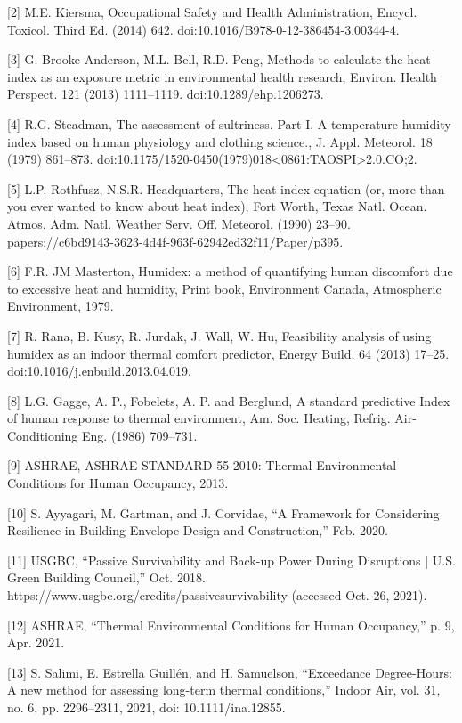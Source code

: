 {[}2{]} M.E. Kiersma, Occupational Safety and Health Administration, Encycl.
Toxicol. Third Ed. (2014) 642. doi:10.1016/B978-0-12-386454-3.00344-4.

{[}3{]} G. Brooke Anderson, M.L. Bell, R.D. Peng, Methods to calculate the heat
index as an exposure metric in environmental health research, Environ. Health
Perspect. 121 (2013) 1111–1119. doi:10.1289/ehp.1206273.

{[}4{]} R.G. Steadman, The assessment of sultriness. Part I. A
temperature-humidity index based on human physiology and clothing science., J.
Appl. Meteorol. 18 (1979) 861–873.
doi:10.1175/1520-0450(1979)018<0861:TAOSPI>2.0.CO;2.

{[}5{]} L.P. Rothfusz, N.S.R. Headquarters, The heat index equation (or, more
than you ever wanted to know about heat index), Fort Worth, Texas Natl. Ocean.
Atmos. Adm. Natl. Weather Serv. Off. Meteorol. (1990) 23–90.
papers://c6bd9143-3623-4d4f-963f-62942ed32f11/Paper/p395.

{[}6{]} F.R. JM Masterton, Humidex: a method of quantifying human discomfort due
to excessive heat and humidity, Print book, Environment Canada, Atmospheric
Environment, 1979.

{[}7{]} R. Rana, B. Kusy, R. Jurdak, J. Wall, W. Hu, Feasibility analysis of
using humidex as an indoor thermal comfort predictor, Energy Build. 64 (2013)
17–25. doi:10.1016/j.enbuild.2013.04.019.

{[}8{]} L.G. Gagge, A. P., Fobelets, A. P. and Berglund, A standard predictive
Index of human response to thermal environment, Am. Soc. Heating, Refrig.
Air-Conditioning Eng. (1986) 709–731.

{[}9{]} ASHRAE, ASHRAE STANDARD 55-2010: Thermal Environmental Conditions for
Human Occupancy, 2013.

{[}10{]} S. Ayyagari, M. Gartman, and J. Corvidae, ``A Framework for Considering
Resilience in Building Envelope Design and Construction,'' Feb. 2020.

{[}11{]} USGBC, ``Passive Survivability and Back-up Power During Disruptions |
U.S. Green Building Council,'' Oct. 2018.
https://www.usgbc.org/credits/passivesurvivability (accessed Oct. 26, 2021).

{[}12{]} ASHRAE, ``Thermal Environmental Conditions for Human Occupancy,'' p. 9,
Apr. 2021.

{[}13{]} S. Salimi, E. Estrella Guillén, and H. Samuelson, ``Exceedance
Degree-Hours: A new method for assessing long-term thermal conditions,'' Indoor
Air, vol. 31, no. 6, pp. 2296–2311, 2021, doi: 10.1111/ina.12855.

